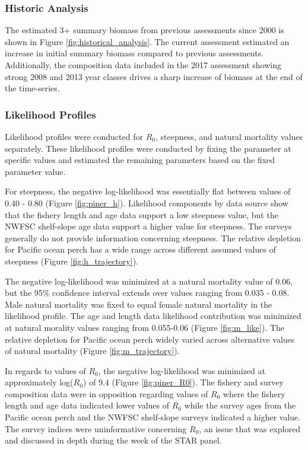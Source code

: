 \documentclass[12pt,]{article}
\begin{document}
\subsubsection{Historic Analysis}\label{historic-analysis}

The estimated 3+ summary biomass from previous assessments since 2000 is
shown in Figure \ref{fig:historical_analysis}. The current assessment
estimated an increase in initial summary biomass compared to previous
assessments. Additionally, the composition data included in the 2017
assessment showing strong 2008 and 2013 year classes drives a sharp
increase of biomass at the end of the time-series.

\subsubsection{Likelihood Profiles}\label{likelihood-profiles}

Likelihood profiles were conducted for \(R_0\), steepness, and natural
mortality values separately. These likelihood profiles were conducted by
fixing the parameter at specific values and estimated the remaining
parameters based on the fixed parameter value.

For steepness, the negative log-likelihood was essentially flat between
values of 0.40 - 0.80 (Figure \ref{fig:piner_h}). Likelihood components
by data source show that the fishery length and age data support a low
steepness value, but the NWFSC shelf-slope age data support a higher
value for steepness. The surveys generally do not provide information
concerning steepness. The relative depletion for Pacific ocean perch has
a wide range across different assumed values of steepness (Figure
\ref{fig:h_trajectory}).

The negative log-likelihood was minimized at a natural mortality value
of 0.06, but the 95\% confidence interval extends over values ranging
from 0.035 - 0.08. Male natural mortality was fixed to equal female
natural mortality in the likelihood profile. The age and length data
likelihood contribution was minimized at natural morality values ranging
from 0.055-0.06 (Figure \ref{fig:m_like}). The relative depletion for
Pacific ocean perch widely varied across alternative values of natural
mortality (Figure \ref{fig:m_trajectory}).

In regards to values of \(R_0\), the negative log-likelihood was
minimized at approximately log(\(R_0\)) of 9.4 (Figure
\ref{fig:piner_R0}). The fishery and survey composition data were in
opposition regarding values of \(R_0\) where the fishery length and age
data indicated lower values of \(R_0\) while the survey ages from the
Pacific ocean perch and the NWFSC shelf-slope surveys indicated a higher
value. The survey indices were uninformative concerning \(R_0\), an
issue that was explored and discussed in depth during the week of the
STAR panel.
\end{document}
